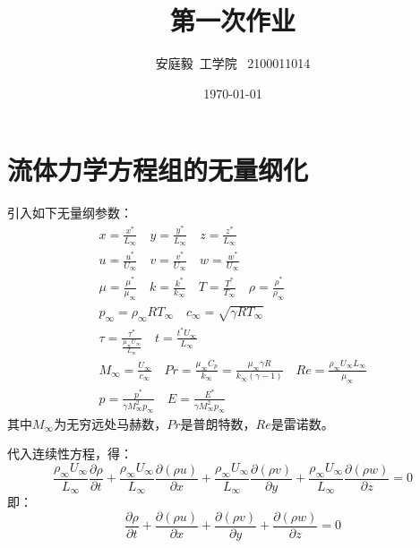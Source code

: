 \documentclass[12pt, a4paper]{article}
\title{第一次作业}
\author{安庭毅\ 工学院 \ 2100011014}
\date{\today} %
\begin{document}
\maketitle %

\section{流体力学方程组的无量纲化}
引入如下无量纲参数：
    \begin{equation}
        \begin{gathered}
            x = \frac{x^{*}}{L_{\infty}} \quad 
            y = \frac{y^{*}}{L_{\infty}} \quad 
            z = \frac{z^{*}}{L_{\infty}} \\
            u = \frac{u^{*}}{U_{\infty}} \quad 
            v = \frac{v^{*}}{U_{\infty}} \quad 
            w = \frac{w^{*}}{U_{\infty}} \\
            \mu = \frac{\mu^{*}}{\mu_{\infty}} \quad
            k = \frac{k^{*}}{k_{\infty}} \quad
            T = \frac{T^{*}}{T_{\infty}} \quad
            \rho = \frac{\rho^{*}}{\rho_{\infty}} \\
            p_{\infty} = \rho_{\infty}RT_{\infty} \quad
            c_{\infty} = \sqrt{\gamma R T_{\infty}} \\
            \tau = \frac{\tau^{*}}{\frac{\mu_{\infty}U_{\infty}}{L_{\infty}}} \quad
            t = \frac{t^{*}U_{\infty}}{L_{\infty}} \\
            M_{\infty} = \frac{U_{\infty}}{c_{\infty}} \quad
            Pr = \frac{\mu_{\infty}C_{p}}{k_{\infty}} = \frac{\mu_{\infty}\gamma R}{k_{\infty}(\gamma - 1)} \quad
            Re = \frac{\rho_{\infty}U_{\infty}L_{\infty}}{\mu_{\infty}} \\
            p = \frac{p^{*}}{\gamma M_{\infty}^{2}p_{\infty}} \quad
            E = \frac{E^{*}}{\gamma M_{\infty}^{2}p_{\infty}}
        \end{gathered}
    \end{equation}
其中$M_{\infty}$为无穷远处马赫数，$Pr$是普朗特数，$Re$是雷诺数。

代入连续性方程，得：
    \begin{equation}
        \frac{\rho_{\infty}U_{\infty}}{L_{\infty}}\frac{\partial\rho}{\partial t} +
        \frac{\rho_{\infty}U_{\infty}}{L_{\infty}}\frac{\partial(\rho u)}{\partial x} +
        \frac{\rho_{\infty}U_{\infty}}{L_{\infty}}\frac{\partial(\rho v)}{\partial y} +
        \frac{\rho_{\infty}U_{\infty}}{L_{\infty}}\frac{\partial(\rho w)}{\partial z} =
        0
    \end{equation}
即：
    \begin{equation}
        \frac{\partial\rho}{\partial t} +
        \frac{\partial(\rho u)}{\partial x} +
        \frac{\partial(\rho v)}{\partial y} +
        \frac{\partial(\rho w)}{\partial z} =
        0
    \end{equation}
\end{document}
